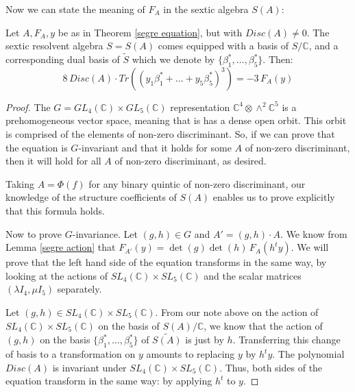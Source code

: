 \documentclass{report}
\begin{document}
Now we can state the meaning of $F_A$ in the sextic algebra $S(A)$:

\begin{theorem} \label{trace cubed}
Let $A, F_A, y$ be as in Theorem \ref{segre equation}, but with $Disc(A) \neq 0$.  The sextic resolvent algebra $S = S(A)$ comes equipped with a basis of $S / \mathbb{C}$, and a corresponding dual basis of $\tilde{S}$ which we denote by $\{ \beta_1^*, \ldots, \beta_5^* \}$.  Then:
\begin{equation}
8 \, Disc(A) \cdot Tr( (y_1 \beta_1^* + \ldots + y_5 \beta_5^*)^3 ) = - 3 \, F_A(y)
\end{equation}
\end{theorem}

\begin{proof}
The $G = GL_4(\mathbb{C}) \times GL_5(\mathbb{C})$ representation $\mathbb{C}^4 \otimes \wedge^2 \mathbb{C}^5$ is a prehomogeneous vector space, meaning that is has a dense open orbit.  This orbit is comprised of the elements of non-zero discriminant.  So, if we can prove that the equation is $G$-invariant and that it holds for some $A$ of non-zero discriminant, then it will hold for all $A$ of non-zero discriminant, as desired.

Taking $A = \Phi(f)$ for any binary quintic of non-zero discriminant, our knowledge of the structure coefficients of $S(A)$ enables us to prove explicitly that this formula holds.

Now to prove $G$-invariance.  Let $(g,h) \in G$ and $A' = (g,h) \cdot A$.  We know from Lemma \ref{segre action} that $F_{A'}(y) = \det(g) \det(h) \, F_A(h^t y)$.  We will prove that the left hand side of the equation transforms in the same way, by looking at the actions of $SL_4(\mathbb{C}) \times SL_5(\mathbb{C})$ and the scalar matrices $(\lambda I_4,\mu I_5)$ separately.

Let $(g,h) \in SL_4(\mathbb{C}) \times SL_5(\mathbb{C})$.  From our note above on the action of $SL_4(\mathbb{C}) \times SL_5(\mathbb{C})$ on the basis of $S(A)/\mathbb{C}$, we know that the action of $(g,h)$ on the basis $\{\beta_1^*,\ldots,\beta_5^*\}$ of $\tilde{S(A)}$ is just by $h$.  Transferring this change of basis to a transformation on $y$ amounts to replacing $y$ by $h^t y$.  The polynomial $Disc(A)$ is invariant under $SL_4(\mathbb{C}) \times SL_5(\mathbb{C})$.  Thus, both sides of the equation transform in the same way: by applying $h^t$ to $y$.


\end{proof}
\end{document}
